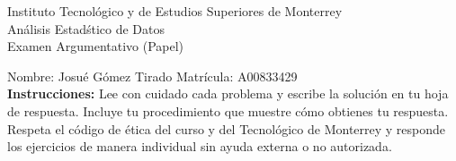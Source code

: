 \documentclass[10pt]{report}
\begin{document}
\newpage



\begin{center}
{\large Instituto Tecnol\'{o}gico y de Estudios Superiores de Monterrey \\
An\'alisis Estad\'stico de Datos } \\
Examen Argumentativo (Papel)
\end{center}

Nombre: \underline{\hspace*{.2in}}
Josué G\'omez Tirado
\underline{\hspace*{.2in}} \quad Matr\'icula:\underline{\hspace*{.2in}}
A00833429
\underline{\hspace*{.2in}} \\

{\bf Instrucciones:} Lee con cuidado cada problema y escribe la soluci\'on
en tu hoja de respuesta. Incluye tu procedimiento que muestre c\'omo obtienes tu respuesta.  Respeta el c\'odigo de \'etica del curso y del Tecnol\'ogico de Monterrey y responde los ejercicios de manera individual sin ayuda externa o no autorizada.
\end{document}

